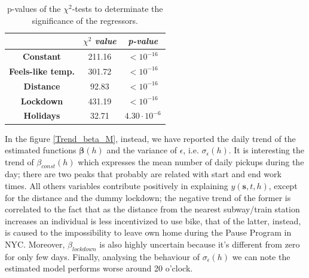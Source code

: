 \begin{table}[h!]
	\centering
	\renewcommand\arraystretch{1.3}
	\begin{tabular}{c|c|c}
		\hline
		\textit{} & $\chi^2$ \textit{value} & \textit{p-value} \\
		\hline
		\textbf{Constant} & \num{211.16} & $< 10^{-16}$ \\
		\hline
		\textbf{Feels-like temp.} & \num{301.72} & $< 10^{-16}$ \\
		\hline
		\textbf{Distance} & \num{92.83} & $<10^{-16}$ \\
		\hline
		\textbf{Lockdown} & \num{431.19} & $<10^{-16}$ \\
		\hline
		\textbf{Holidays} & \num{32.71} & $4.30 \cdot 10^{-6}$ \\
		\hline
	\end{tabular}
	\caption[p-values of the $\chi^2$-tests to determinate the significance of the regressors (f-HDGM)]{p-values of the $\chi^2$-tests to determinate the significance of the regressors.}
	\label{Chi2_p_values}
\end{table}

\noindent
In the figure \ref{Trend_beta_M}, instead, we have reported the daily trend of the estimated functions $\boldsymbol{\beta}(h)$ and the variance of $\epsilon$, i.e. $\sigma_{\epsilon}(h)$. It is interesting the trend of $\beta_{const}(h)$ which expresses the mean number of daily pickups during the day; there are two peaks that probably are related with start and end work times. All others variables contribute positively in explaining $y(\boldsymbol{s}, t, h)$, except for the distance and the dummy lockdown; the negative trend of the former is correlated to the fact that as the distance from the nearest subway/train station increases an individual is less incentivized to use bike, that of the latter, instead, is caused to the impossibility to leave own home during the Pause Program in NYC. Moreover, $\beta_{lockdown}$ is also highly uncertain because it's different from zero for only few days. Finally, analysing the behaviour of $\sigma_{\epsilon}(h)$ we can note the estimated model performs worse around 20 o'clock.

